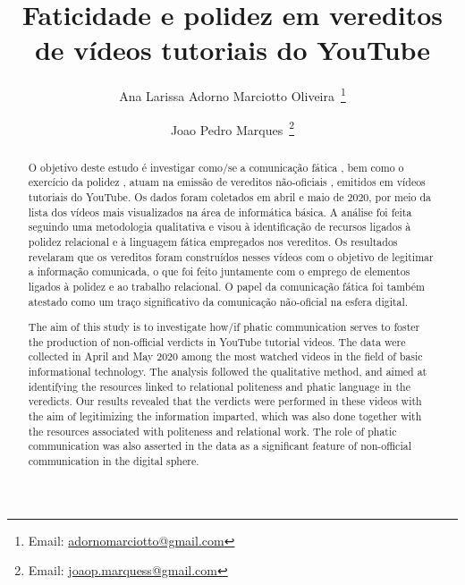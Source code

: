 \documentclass[portuguese]{textolivre}
\title{Faticidade e polidez em vereditos de vídeos tutoriais do YouTube}
\author[1]{Ana Larissa Adorno Marciotto Oliveira~\orcid{0000-0003-1857-0207}\thanks{Email: \href{mailto:adornomarciotto@gmail.com}{adornomarciotto@gmail.com}}}
\author[1]{Joao Pedro Marques~\orcid{0000-0001-7312-9516}\thanks{Email: \href{mailto:joaop.marquess@gmail.com}{joaop.marquess@gmail.com}}}
\affil[1]{Universidade Federal de Minas Gerais, Faculdade de Letras, Belo Horizonte, MG, Brasil.}
\begin{document}
\maketitle





\begin{polyabstract}
\begin{abstract}
O objetivo deste estudo é investigar como/se a comunicação fática \cite{zuckerman2016}, bem como o exercício da polidez \cite{locher2005,miller2008}, atuam na emissão de vereditos não-oficiais \cite{austin1975, labinza2021}, emitidos em vídeos tutoriais do YouTube. Os dados foram coletados em abril e maio de 2020, por meio da lista dos vídeos mais visualizados na área de informática básica. A análise foi feita seguindo uma metodologia qualitativa e visou à identificação de recursos ligados à polidez relacional e à linguagem fática empregados nos vereditos. Os resultados revelaram que os vereditos foram construídos nesses vídeos com o objetivo de legitimar a informação comunicada, o que foi feito juntamente com o emprego de elementos ligados à polidez e ao trabalho relacional. O papel da comunicação fática foi também atestado como um traço significativo da comunicação não-oficial na esfera digital.    

\end{abstract}

\begin{english}
\begin{abstract}
The aim of this study is to investigate how/if phatic communication \cite{zuckerman2016} serves to foster the production of non-official verdicts \cite{austin1975, labinza2021, locher2005,miller2008} in YouTube tutorial videos. The data were collected in April and May 2020 among the most watched videos in the field of basic informational technology. The analysis followed the qualitative method, and aimed at identifying the resources linked to relational politeness and phatic language in the veredicts. Our results revealed that the verdicts were performed in these videos with the aim of legitimizing the information imparted, which was also done together with the resources associated with politeness and relational work. The role of phatic communication  was also asserted in the data as a significant feature of non-official communication in the digital sphere.

\end{abstract}
\end{english}
\end{polyabstract}
\end{document}
